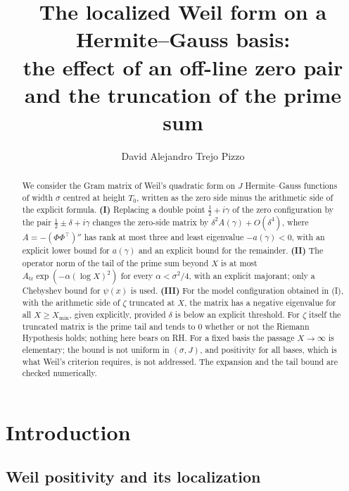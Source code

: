 \documentclass[11pt]{amsart}
\title[The localized Weil form on a Hermite--Gauss basis]{The localized Weil form on a Hermite--Gauss basis:\\[3pt]
the effect of an off-line zero pair and the truncation of the prime sum}
\author{David Alejandro Trejo Pizzo}
\theoremstyle{definition}
\theoremstyle{remark}
\newcommand{\Atr}{A_{\mathrm{tr}}}
\begin{document}
\begin{abstract}
We consider the Gram matrix of Weil's quadratic form on $J$ Hermite--Gauss
functions of width $\sigma$ centred at height $T_0$, written as the zero
side minus the arithmetic side of the explicit formula.
\textbf{(I)} Replacing a double point $\tfrac12+i\gamma$ of the zero configuration by the pair
$\tfrac12\pm\delta+i\gamma$ changes the zero-side matrix by
$\delta^2A(\gamma)+O(\delta^4)$, where $A=-(\Phi\Phi^{\top})''$ has rank at
most three and least eigenvalue $-a(\gamma)<0$, with an explicit lower bound
for $a(\gamma)$ and an explicit bound for the remainder.
\textbf{(II)} The operator norm of the tail of the prime sum beyond $X$ is at
most $\Atr\exp(-\alpha(\log X)^2)$ for every $\alpha<\sigma^2/4$, with an
explicit majorant; only a Chebyshev bound for $\psi(x)$ is used.
\textbf{(III)} For the model configuration obtained in (I), with the
arithmetic side of $\zeta$ truncated at $X$, the matrix has a negative
eigenvalue for all $X\ge X_{\min}$, given explicitly, provided $\delta$ is
below an explicit threshold. For $\zeta$ itself the
truncated matrix is the prime tail and tends to $0$ whether or not the
Riemann Hypothesis holds; nothing here bears on RH. For a fixed basis the
passage $X\to\infty$ is elementary; the bound is not uniform in $(\sigma,J)$,
and positivity for all bases, which is what Weil's criterion requires, is not
addressed. The expansion and the tail bound are checked numerically.
\end{abstract}

\maketitle

\tableofcontents

\section{Introduction}\label{sec:intro}
\subsection{Weil positivity and its localization}
\end{document}
